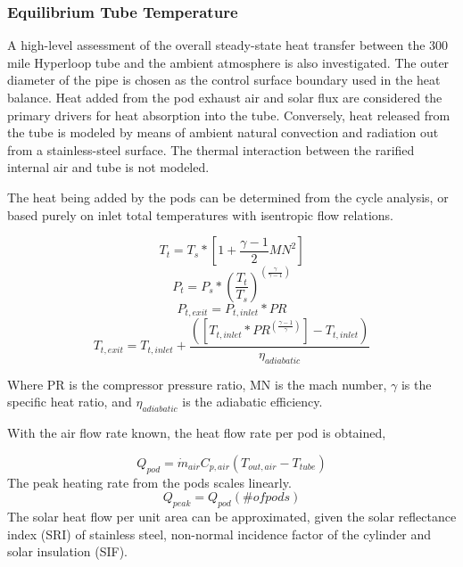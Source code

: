 \documentclass[heading.tex]{subfiles}
\begin{document}
\subsubsection{Equilibrium Tube Temperature}
A high-level assessment of the overall steady-state heat transfer between the 300 mile Hyperloop tube and the ambient atmosphere is
also investigated. The outer diameter of the pipe is chosen as the control surface boundary used in the heat balance. Heat added from the pod exhaust
air and solar flux are considered the primary drivers for heat absorption into the tube. Conversely, heat released from the tube is modeled by means of
ambient natural convection and radiation out from a stainless-steel surface. The thermal interaction between the rarified internal air and
tube is not modeled.

The heat being added by the pods can be determined from the cycle analysis, or based purely on inlet total temperatures with isentropic
flow relations.

\begin{equation}
T_{t} = T_{s} * [1 + \frac{\gamma -1}{2} MN^2]
\end{equation}
\begin{equation}
P_{t} = P_{s} * (\frac{ T_{t}}{T_{s}})^(\frac{\gamma}{\gamma -1})
\end{equation}
\begin{equation}
P_{t,exit} = P_{t,inlet} * PR
\end{equation}
\begin{equation}
T_{t,exit} = T_{t,inlet} + \frac{([T_{t,inlet}*PR^{(\frac{\gamma-1}{\gamma})}] - T_{t,inlet})}  {{\eta}_{adiabatic}}
\end{equation}

Where PR is the compressor pressure ratio, MN is the mach number,  $\gamma$ is the specific heat ratio, and  ${\eta}_{adiabatic}$ is the
adiabatic efficiency.

With the air flow rate known, the heat flow rate per pod is obtained,

\begin{equation}
{Q}_{pod}= \dot{m}_{air} C_{p,air} (T_{out, air} - T_{tube})
\end{equation}
The peak heating rate from the pods scales linearly.
\begin{equation}
{Q}_{peak}= Q_{pod} (\# ofpods)
\end{equation}
The solar heat flow per unit area can be approximated, given the solar reflectance index (SRI) of stainless steel, non-normal incidence factor
of the cylinder and solar insulation (SIF).
\end{document}

